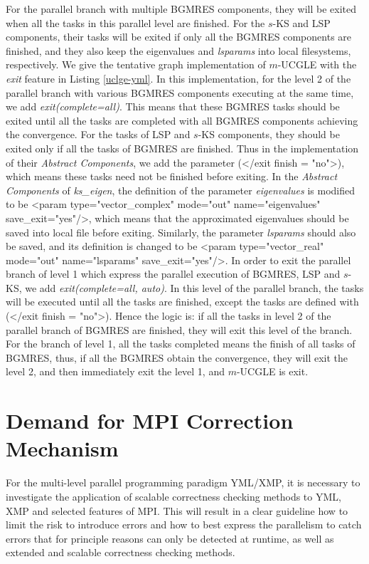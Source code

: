For the parallel branch with multiple BGMRES components, they will be exited when all the tasks in this parallel level are finished. For the $s$-KS and LSP components, their tasks will be exited if only all the BGMRES components are finished, and they also keep the eigenvalues and \textit{lsparams} into local filesystems, respectively. We give the tentative graph implementation of $m$-UCGLE with the \textit{exit} feature in Listing \ref{uclge-yml}. In this implementation, for the level 2 of the parallel branch with various BGMRES components executing at the same time, we add \textit{exit(complete=all)}. This means that these BGMRES tasks should be exited until all the tasks are completed with all BGMRES components achieving the convergence. For the tasks of LSP and $s$-KS components, they should be exited only if all the tasks of BGMRES are finished. Thus in the implementation of their \textit{Abstract Components}, we add the parameter (</exit finish = "no">), which means these tasks need not be finished before exiting. In the \textit{Abstract Components} of \textit{ks\_eigen}, the definition of the parameter \textit{eigenvalues} is modified to be <param type="vector\_complex" mode="out" name="eigenvalues" save\_exit="yes"/>, which means that the approximated eigenvalues should be saved into local file before exiting. Similarly,  the parameter \textit{lsparams} should also be saved, and its definition is  changed to be <param type="vector\_real" mode="out" name="lsparams" save\_exit="yes"/>. In order to exit the parallel branch of level 1 which express the parallel execution of BGMRES, LSP and $s$-KS, we add \textit{exit(complete=all, auto)}. In this level of the parallel branch, the tasks will be executed until all the tasks are finished, except the tasks are defined with (</exit finish = "no">). Hence the logic is: if all the tasks in level 2 of the parallel branch of BGMRES are finished, they will exit this level of the branch. For the branch of level 1, all the tasks completed means the finish of all tasks of BGMRES, thus, if all the BGMRES obtain the convergence, they will exit the level 2, and then immediately exit the level 1, and $m$-UCGLE is exit. 

\section{Demand for MPI Correction Mechanism}

For the multi-level parallel programming paradigm YML/XMP, it is necessary to investigate the application of scalable correctness checking methods to YML, XMP and selected features of MPI. This will result in a clear guideline how to limit the risk to introduce errors and how to best express the parallelism to catch errors that for principle reasons can only be detected at runtime, as well as extended and scalable correctness checking methods.

